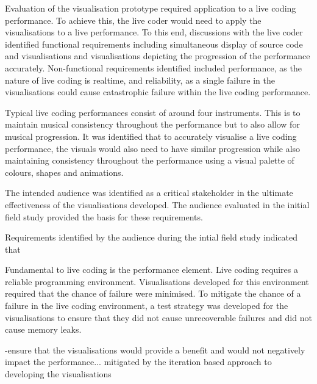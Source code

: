 Evaluation of the visualisation prototype required application to a live coding performance. To achieve this, the live coder would need to apply the visualisations to a live performance. To this end, discussions with the live coder identified functional requirements including simultaneous display of source code and visualisations and visualisations depicting the progression of the performance accurately. Non-functional requirements identified included performance, as the nature of live coding is realtime, and reliability, as a single failure in the visualisations could cause catastrophic failure within the live coding performance.

Typical live coding performances consist of around four instruments. This is to maintain musical consistency throughout the performance but to also allow for musical progression. It was identified that to accurately visualise a live coding performance, the visuals would also need to have similar progression while also maintaining consistency throughout the performance using a visual palette of colours, shapes and animations.

The intended audience was identified as a critical stakeholder in the ultimate effectiveness of the visualisations developed. The audience evaluated in the initial field study provided the basis for these requirements.


Requirements identified by the audience during the intial field study indicated that \more

Fundamental to live coding is the performance element. Live coding requires a reliable programming environment. Visualisations developed for this environment required that the chance of failure were minimised. To mitigate the chance of a failure in the live coding environment, a test strategy was developed for the visualisations to ensure that they did not cause unrecoverable failures and did not cause memory leaks.


-ensure that the visualisations would provide a benefit and would not negatively impact the performance... mitigated by the iteration based approach to developing the visualisations

